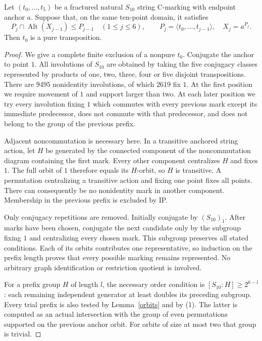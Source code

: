 \documentclass[11pt,a4paper]{article}
\newcommand{\gen}[1]{\langle#1\rangle}
\newcommand{\Alt}{\operatorname{Alt}}
\begin{document}
\begin{theorem}\label{ten}
Let $(t_0,\ldots,t_5)$ be a fractured natural $S_{10}$ string
C-marking with endpoint anchor $a$. Suppose that, on the same
ten-point domain, it satisfies
\[
 P_j\cap\Alt(X_{j-1})\le P_{j-1}\quad(1\le j\le6),
 \qquad P_j=\gen{t_0,\ldots,t_{j-1}},\quad X_j=a^{P_j}.
                                                        \tag{1}
\]
Then $t_0$ is a pure transposition.
\end{theorem}
\begin{proof}
We give a complete finite exclusion of a nonpure $t_0$.
Conjugate the anchor to point $1$. All involutions of $S_{10}$
are obtained by taking the five conjugacy classes represented by
products of one, two, three, four or five disjoint transpositions.
There are $9495$ nonidentity involutions, of which $2619$ fix $1$.
At the first position we require movement of $1$ and support
larger than two. At each later position we try every involution
fixing $1$ which commutes with every previous mark except its
immediate predecessor, does not commute with that predecessor,
and does not belong to the group of the previous prefix.

Adjacent noncommutation is necessary here. In a transitive anchored
string action, let $H$ be generated by the connected component of
the noncommutation diagram containing the first mark. Every other
component centralizes $H$ and fixes $1$. The full orbit of $1$
therefore equals its $H$-orbit, so $H$ is transitive. A permutation
centralizing a transitive action and fixing one point fixes all
points. There can consequently be no nonidentity mark in another
component. Membership in the previous prefix is excluded by IP.

Only conjugacy repetitions are removed. Initially conjugate by
$(S_{10})_1$. After marks have been chosen, conjugate the next
candidate only by the subgroup fixing $1$ and centralizing every
chosen mark. This subgroup preserves all stated conditions.
Each of its orbits contributes one representative, so induction
on the prefix length proves that every possible marking remains
represented. No arbitrary graph identification or restriction
quotient is involved.

For a prefix group $H$ of length $l$, the necessary order condition
is $[S_{10}:H]\ge2^{6-l}$: each remaining independent generator
at least doubles its preceding subgroup. Every trial prefix is
also tested by Lemma~\ref{orbits} and by (1).
The latter is computed as an actual intersection with the group
of even permutations supported on the previous anchor orbit.
For orbits of size at most two that group is trivial.


\end{proof}
\end{document}
